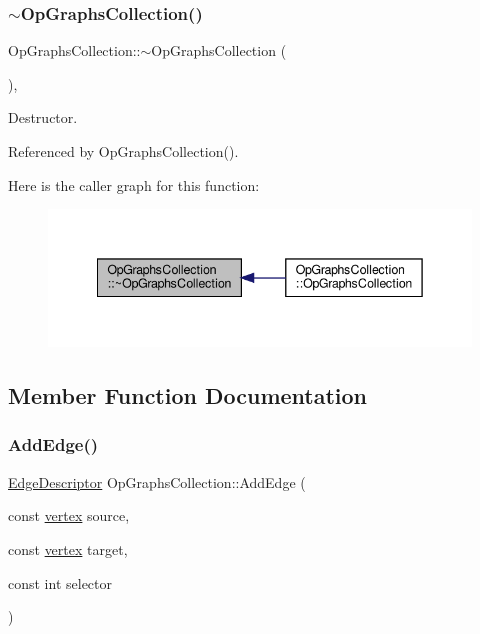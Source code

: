 \subsubsection{\texorpdfstring{$\sim$\+Op\+Graphs\+Collection()}{~OpGraphsCollection()}}
{\footnotesize\ttfamily Op\+Graphs\+Collection\+::$\sim$\+Op\+Graphs\+Collection (\begin{DoxyParamCaption}{ }\end{DoxyParamCaption})\hspace{0.3cm}{\ttfamily [override]}, {\ttfamily [default]}}



Destructor. 



Referenced by Op\+Graphs\+Collection().

Here is the caller graph for this function\+:
\nopagebreak
\begin{figure}[H]
\begin{center}
\leavevmode
\includegraphics[width=342pt]{da/df9/classOpGraphsCollection_aadeed6f2688a706898f7c417d8a01af6_icgraph}
\end{center}
\end{figure}


\subsection{Member Function Documentation}
\mbox{\label{classOpGraphsCollection_a5c0f3300131b1b6246b710e8fc10c0dc}} 
\subsubsection{\texorpdfstring{Add\+Edge()}{AddEdge()}}
{\footnotesize\ttfamily \hyperlink{graph_8hpp_a9eb9afea34e09f484b21f2efd263dd48}{Edge\+Descriptor} Op\+Graphs\+Collection\+::\+Add\+Edge (\begin{DoxyParamCaption}\item[{const \hyperlink{graph_8hpp_abefdcf0544e601805af44eca032cca14}{vertex}}]{source,  }\item[{const \hyperlink{graph_8hpp_abefdcf0544e601805af44eca032cca14}{vertex}}]{target,  }\item[{const int}]{selector }\end{DoxyParamCaption})\hspace{0.3cm}{\ttfamily [inline]}}



